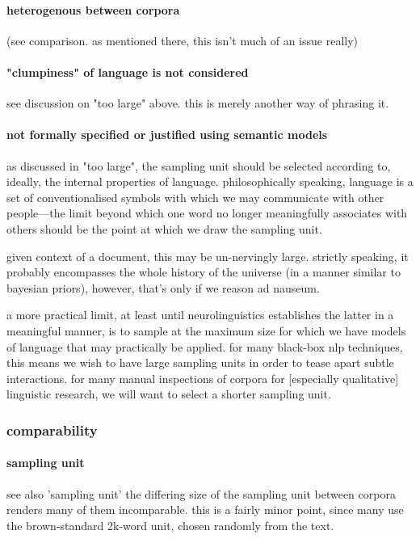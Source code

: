 \paragraph{heterogenous between corpora }
(see comparison.  as mentioned there, this isn't much of an issue really)



\paragraph{"clumpiness" of language is not considered}
see discussion on "too large" above.  this is merely another way of phrasing it.


\paragraph{not formally specified or justified using semantic models}
as discussed in "too large", the sampling unit should be selected according to, ideally, the internal properties of language.  philosophically speaking, language is a set of conventionalised symbols with which we may communicate with other people---the limit beyond which one word no longer meaningfully associates with others should be the point at which we draw the sampling unit.

given context of a document, this may be un-nervingly large.  strictly speaking, it probably encompasses the whole history of the universe (in a manner similar to bayesian priors), however, that's only if we reason ad nauseum.

a more practical limit, at least until neurolinguistics establishes the latter in a meaningful manner, is to sample at the maximum size for which we have models of language that may practically be applied.  for many black-box nlp techniques, this means we wish to have large sampling units in order to tease apart subtle interactions.  for many manual inspections of corpora for [especially qualitative] linguistic research, we will want to select a shorter sampling unit.



\subsubsection{comparability}

\paragraph{sampling unit}
see also 'sampling unit'
the differing size of the sampling unit between corpora renders many of them incomparable.  this is a fairly minor point, since many use the brown-standard 2k-word unit, chosen randomly from the text.


